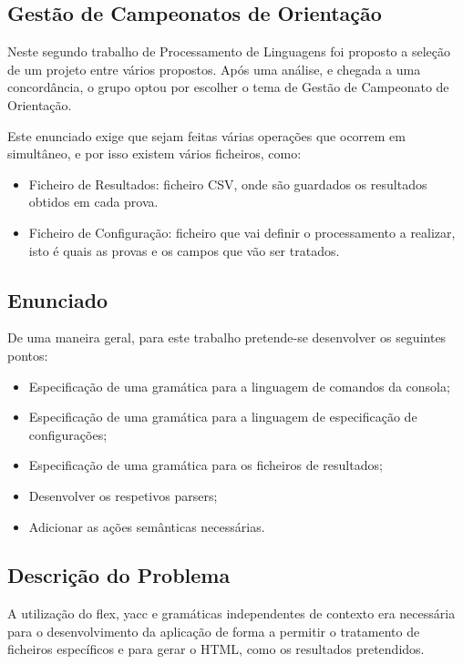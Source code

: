 \documentclass[11pt, a4paper, oneside]{article}
\begin{document}
\subsection{Gestão de Campeonatos de Orientação}

Neste segundo trabalho de Processamento de Linguagens foi proposto a seleção de um projeto entre vários propostos. Após uma análise, e chegada a uma concordância, o grupo optou por escolher o tema de Gestão de Campeonato de Orientação.

Este enunciado exige que sejam feitas várias operações que ocorrem em simultâneo, e por isso existem vários ficheiros, como:
\begin{itemize}
\item Ficheiro de Resultados: ficheiro CSV, onde são guardados os resultados obtidos em cada prova.

\item Ficheiro de Configuração: ficheiro que vai definir o processamento a realizar, isto é quais as provas e os campos que vão ser tratados.
\end{itemize}

\subsection{Enunciado}

De uma maneira geral, para este trabalho pretende-se desenvolver os seguintes pontos:

\begin{itemize}
\item Especificação de uma gramática para a linguagem de comandos da consola;
\item Especificação de uma gramática para a linguagem de especificação de configurações;
\item Especificação de uma gramática para os ficheiros de resultados;
\item Desenvolver os respetivos parsers;
\item Adicionar as ações semânticas necessárias.
\end{itemize}

\subsection{Descrição do Problema}

A utilização do \textsf{flex}, \textsf{yacc} e gramáticas independentes de contexto era necessária para o desenvolvimento da aplicação de forma a permitir o tratamento de ficheiros específicos e para gerar o HTML, como os resultados pretendidos.
\end{document}
